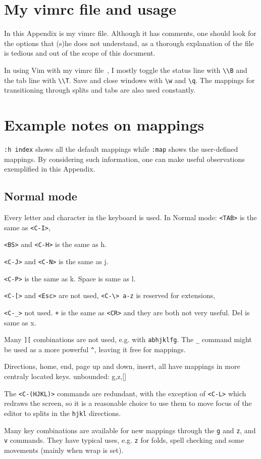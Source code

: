 \documentclass{article}
\newcommand{\ttt}[1] {
	\texttt{<#1>}}
\newcommand{\tttt}[1]{\texttt{#1}}
\begin{document}
\section{My vimrc file and usage}
In this Appendix is my vimrc file.
Although it has comments, one should
look for the options that (s)he does
not understand, as a thorough explanation
of the file is tedious and out of the scope
of this document.

In using Vim with my vimrc file~\cite{vimrc},
I mostly toggle the status line with \texttt{\textbackslash\textbackslash B}
and the tab line with \texttt{\textbackslash\textbackslash T}.
Save and close windows with \texttt{\textbackslash w} and \texttt{\textbackslash q}.
The mappings for transitioning through splits and tabs
are also used constantly.

\section{Example notes on mappings}\label{notes}
\texttt{:h index} shows all the default mappings
while \tttt{:map} shows the user-defined mappings.
By considering such information, one can make
useful observations exemplified in this Appendix.

\subsection{Normal mode}
Every letter and character in the keyboard is used.
In Normal mode: \ttt{TAB} is the same as \ttt{C-I},
\ttt{BS} and \ttt{C-H} is the same as h.
\ttt{C-J} and \ttt{C-N} is the same as j.
\ttt{C-P} is the same as k.
Space is same as l.
\ttt{C-[} and \ttt{Esc} are not used,
\tttt{<C-\textbackslash> a-z} is reserved for extensions,
\ttt{C-\_} not used.
\tttt{+} is the same as \ttt{CR} and they are both not very useful.
Del is same as x.

Many \tttt{][} combinations are not used, e.g.
with \tttt{abhjklfg}.
The \tttt{\_} command might be used as a more powerful \tttt{\^},
leaving it free for mappings.

Directions, home, end, page up and down, insert, all have mappings
in more centraly located keys.
unbounded: g,z,[]

The \ttt{C-(HJKL)} commands are redundant,
with the exception of \ttt{C-L} which redraws the screen,
so it is a reasonable choice to use them to move focus
of the editor to splits in the \tttt{hjkl} directions.

Many key combinations are available for new mappings through the \tttt{g}
and \tttt{z}, and \tttt{v} commands.
They have typical uses, e.g. \tttt{z} for folds,
spell checking and some movements (mainly when wrap is set).
\end{document}
